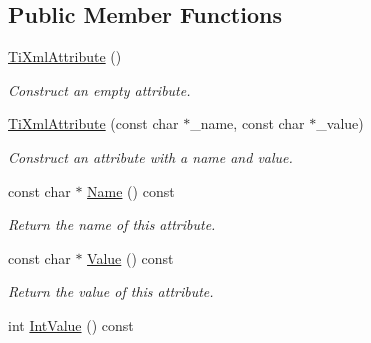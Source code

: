 \subsection*{\-Public \-Member \-Functions}
\begin{DoxyCompactItemize}
\item 
\hypertarget{class_ti_xml_attribute_a9cfa3c8179873fd485d83003b114f8e1}{\hyperlink{class_ti_xml_attribute_a9cfa3c8179873fd485d83003b114f8e1}{\-Ti\-Xml\-Attribute} ()}\label{class_ti_xml_attribute_a9cfa3c8179873fd485d83003b114f8e1}

\begin{DoxyCompactList}\small\item\em \-Construct an empty attribute. \end{DoxyCompactList}\item 
\hypertarget{class_ti_xml_attribute_a759d0b76fb8fcf765ecab243bc14f05e}{\hyperlink{class_ti_xml_attribute_a759d0b76fb8fcf765ecab243bc14f05e}{\-Ti\-Xml\-Attribute} (const char $\ast$\-\_\-name, const char $\ast$\-\_\-value)}\label{class_ti_xml_attribute_a759d0b76fb8fcf765ecab243bc14f05e}

\begin{DoxyCompactList}\small\item\em \-Construct an attribute with a name and value. \end{DoxyCompactList}\item 
\hypertarget{class_ti_xml_attribute_a298a57287d305904ba6bd96ae6f78d3d}{const char $\ast$ \hyperlink{class_ti_xml_attribute_a298a57287d305904ba6bd96ae6f78d3d}{\-Name} () const }\label{class_ti_xml_attribute_a298a57287d305904ba6bd96ae6f78d3d}

\begin{DoxyCompactList}\small\item\em \-Return the name of this attribute. \end{DoxyCompactList}\item 
\hypertarget{class_ti_xml_attribute_a0f874490eac8ca00ee0070765d0e97e3}{const char $\ast$ \hyperlink{class_ti_xml_attribute_a0f874490eac8ca00ee0070765d0e97e3}{\-Value} () const }\label{class_ti_xml_attribute_a0f874490eac8ca00ee0070765d0e97e3}

\begin{DoxyCompactList}\small\item\em \-Return the value of this attribute. \end{DoxyCompactList}\item 
\hypertarget{class_ti_xml_attribute_aa1a20ad59dc7e89a0ab265396360d50f}{int \hyperlink{class_ti_xml_attribute_aa1a20ad59dc7e89a0ab265396360d50f}{\-Int\-Value} () const }\label{class_ti_xml_attribute_aa1a20ad59dc7e89a0ab265396360d50f}


\end{DoxyCompactItemize}
